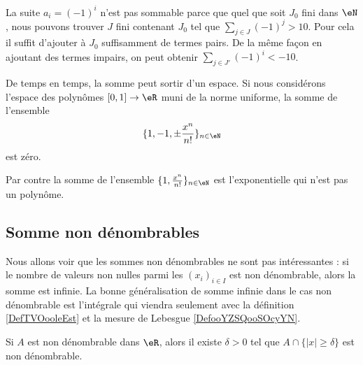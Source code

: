 \begin{example}
    La suite \( a_i=(-1)^i\) n'est pas sommable parce que quel que soit \( J_0\) fini dans \( \eN\), nous pouvons trouver \( J\) fini contenant \( J_0\) tel que \( \sum_{j\in J}(-1)^j>10\). Pour cela il suffit d'ajouter à \( J_0\) suffisamment de termes pairs. De la même façon en ajoutant des termes impairs, on peut obtenir \( \sum_{j\in J'}(-1)^i<-10\).
\end{example}

\begin{example}
    De temps en temps, la somme peut sortir d'un espace. Si nous considérons l'espace des polynômes \( \mathopen[ 0 , 1 \mathclose]\to \eR\) muni de la norme uniforme, la somme de l'ensemble
    \begin{equation}
        \{ 1,-1,\pm\frac{ x^n }{ n! } \}_{n\in \eN}
    \end{equation}
    est zéro.

    Par contre la somme de l'ensemble \( \{ 1,\frac{ x^n }{ n! } \}_{n\in \eN}\) est l'exponentielle qui n'est pas un polynôme.
\end{example}

\subsection{Somme non dénombrables}

Nous allons voir que les sommes non dénombrables ne sont pas intéressantes : si le nombre de valeurs non nulles parmi les \( (x_i)_{i\in I}\) est non dénombrable, alors la somme est infinie. La bonne généralisation de somme infinie dans le cas non dénombrable est l'intégrale qui viendra seulement avec la définition \ref{DefTVOooleEst} et la mesure de Lebesgue \ref{DefooYZSQooSOcyYN}.

\begin{lemma}       \label{LEMooYJCVooHajEbg}
    Si \( A\) est non dénombrable dans \( \eR\), alors il existe \( \delta>0\) tel que \( A\cap \{ | x |\geq \delta \}\) est non dénombrable.
\end{lemma}

